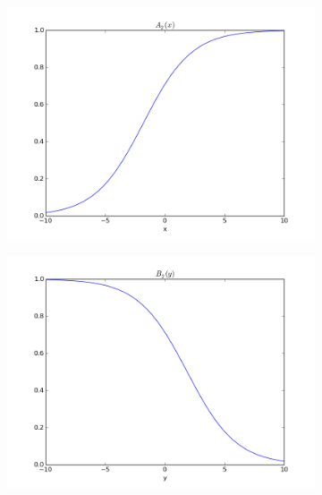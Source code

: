 \documentclass[paper=a4, fontsize=11pt]{scrartcl} %
\numberwithin{equation}{section} %
\numberwithin{figure}{section} %
\numberwithin{table}{section} %
\begin{document}
\begin{figure}[h]
\begin{subfigure}[b]{0.45\textwidth}
\includegraphics[width=\textwidth]{A_B/figure_3.png}
\end{subfigure}
\begin{subfigure}[b]{0.45\textwidth}
\includegraphics[width=\textwidth]{A_B/figure_4.png}
\end{subfigure}


\end{figure}
\end{document}
